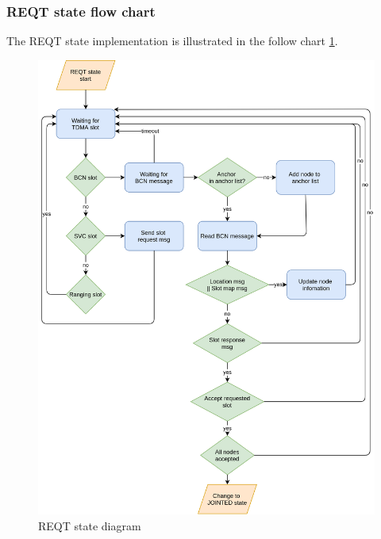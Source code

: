 \documentclass[\main/main.tex]{subfiles}
\begin{document}
\subsubsection{REQT state flow chart}
The REQT state implementation is illustrated in the follow chart \ref{fig:REQT_state_diagram}.
\begin{figure}[H]
    \begin{center}
        \includegraphics[scale=0.33]{REQT_flow_chart.png}
    \end{center}
    \caption{REQT state diagram}
    \label{fig:REQT_state_diagram}
\end{figure}
\end{document}
